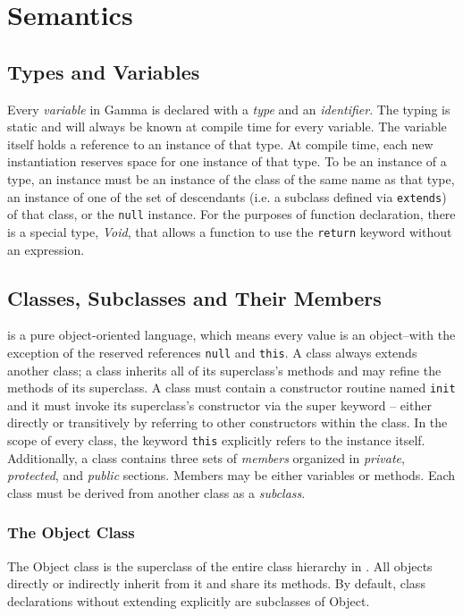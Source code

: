 \section{Semantics}

\subsection{Types and Variables}
Every \textit{variable} in Gamma is declared with a \textit{type} and an \textit{identifier}. The typing is static and will always be known at compile time for every variable. The variable itself holds a reference to an instance of that type. At compile time, each new instantiation reserves space for one instance of that type. To be an instance of a type, an instance must be an instance of the class of the same name as that type, an instance of one of the set of descendants (i.e. a subclass defined via \verb!extends!) of that class, or the {\tt null} instance. For the purposes of function declaration, there is a special type, \textit{Void}, that allows a function to use the \verb!return! keyword without an expression.

\subsection{Classes, Subclasses and Their Members}
\Lang{} is a pure object-oriented language, which means every value is an object--with the exception of the reserved references \verb!null! and \verb!this!. A class always extends another class; a class inherits all of its superclass's methods and may refine the methods of its superclass. A class must contain a constructor routine named {\tt init} and it must invoke its superclass's constructor via the super keyword -- either directly or transitively by referring to other constructors within the class. In the scope of every class, the keyword \verb!this! explicitly refers to the instance itself. Additionally, a class contains three sets of \textit{members} organized in \textit{private}, \textit{protected}, and \textit{public} sections. Members may be either variables or methods. Each class must be derived from another class as a \textit{subclass}.

\subsubsection{The Object Class}
The Object class is the superclass of the entire class hierarchy in \Lang{}. All objects directly or indirectly inherit from it and share its methods. By default, class declarations without extending explicitly are subclasses of Object.

